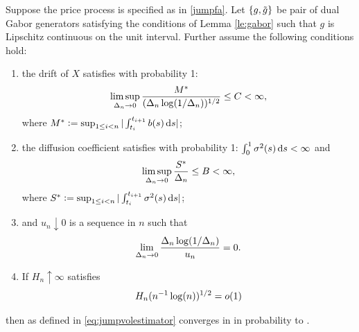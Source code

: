 \begin{prop}\label{pro:finite}
  Suppose the  price process is specified as in \eqref{jumpfa}. Let $\{g, \tilde{g}\}$ be pair of dual Gabor generators satisfying the conditions of Lemma \eqref{le:gabor} such that $g$ is Lipschitz continuous on the unit interval. Further assume the following conditions hold:
  \begin{enumerate}[label=\emph{(}\roman*\emph{)}]
    \item 
  the drift of $X$ satisfies with probability 1:
  \begin{align}
    \limsup_{\Delta_n \to 0} \frac{M^*}{(\Delta_n \log(1/\Delta_n))^{1/2}} \le  C< \infty, \notag
    \label{}
  \end{align}
where $M^* : = \sup_{1 \le i <n} \vert \int^{t_{i+1}}_{t_i} b(s) \D s\vert$;
\item the diffusion coefficient satisfies with probability 1:  $\int^1_0 \sigma^2(s) \D s < \infty$ and 
  \begin{align}
\limsup_{\Delta_n \to 0} \frac{S^*}{\Delta_n} \le B <\infty, \notag
    \label{}
  \end{align}
  where $S^* := \sup_{1 \le i <n} \vert \int^{t_{i+1}}_{t_i} \sigma^2(s) \D s\vert$;
\item and   $u_n \downarrow 0 $ is a sequence in $n$ such that  
\begin{align}
    \lim_{\Delta_n \to 0} \frac{\Delta_n \log (1/\Delta_n)}{u_n} = 0.\notag
    \label{}
  \end{align}
\item If $H_n \uparrow \infty$ satisfies 
  \begin{align}
    H_n (n^{-1} \log(n))^{1/2} = o(1)\notag
    \label{}
  \end{align}
  \end{enumerate}
  then
  \jvn as defined in \eqref{eq:jumpvolestimator}  converges in \Ltwo in probability to \sv.
\end{prop}
